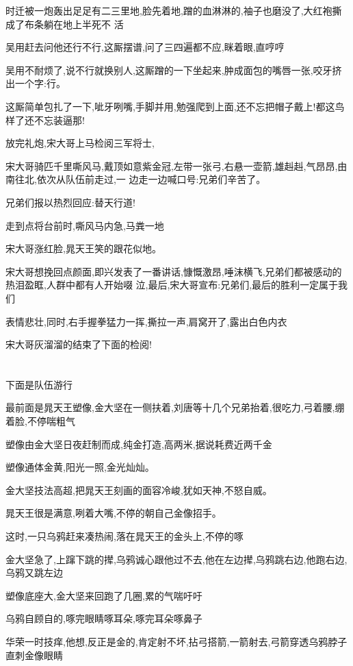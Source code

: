﻿\documentclass[12pt]{article}
\begin{document}
时迁被一炮轰出足足有二三里地,脸先着地,蹭的血淋淋的,袖子也磨没了,大红袍撕成了布条\dldots 躺在地上半死不
活\dldots

吴用赶去问他还行不行,这厮摆谱,问了三四遍都不应,眯着眼,直哼哼\dldots

吴用不耐烦了,说不行就换别人,这厮蹭的一下坐起来,肿成面包的嘴唇一张,咬牙挤出一个字:行。

这厮简单包扎了一下,呲牙咧嘴,手脚并用,勉强爬到上面,还不忘把帽子戴上!都这鸟样了还不忘装逼那!

放完礼炮,宋大哥上马检阅三军将士,

宋大哥骑匹千里嘶风马,戴顶如意紫金冠,左带一张弓,右悬一壶箭,雄赳赳,气昂昂,由南往北,依次从队伍前走过,一
边走一边喊口号:兄弟们辛苦了。

兄弟们报以热烈回应:替天行道!

走到点将台前时,嘶风马内急,马粪一地

宋大哥涨红脸,晁天王笑的跟花似地。

宋大哥想挽回点颜面,即兴发表了一番讲话,慷慨激昂,唾沫横飞,兄弟们都被感动的热泪盈眶,人群中都有人开始啜
泣,最后,宋大哥宣布:兄弟们,最后的胜利一定属于我们

表情悲壮,同时,右手握拳猛力一挥,撕拉一声,肩窝开了,露出白色内衣\dldots

宋大哥灰溜溜的结束了下面的检阅!
\section{}

下面是队伍游行

最前面是晁天王塑像,金大坚在一侧扶着,刘唐等十几个兄弟抬着,很吃力,弓着腰,绷着脸,不停喘粗气

塑像由金大坚日夜赶制而成,纯金打造,高两米,据说耗费近两千金

塑像通体金黄,阳光一照,金光灿灿。

金大坚技法高超,把晁天王刻画的面容冷峻,犹如天神,不怒自威。

晁天王很是满意,咧着大嘴,不停的朝自己金像招手。

这时,一只乌鸦赶来凑热闹,落在晁天王的金头上,不停的啄

金大坚急了,上蹿下跳的撵,乌鸦诚心跟他过不去,他在左边撵,乌鸦跳右边,他跑右边,乌鸦又跳左边

塑像底座大,金大坚来回跑了几圈,累的气喘吁吁

乌鸦自顾自的,啄完眼睛啄耳朵,啄完耳朵啄鼻子\dldots

华荣一时技痒,他想,反正是金的,肯定射不坏,拈弓搭箭,一箭射去,弓箭穿透乌鸦脖子直刺金像眼睛
\end{document}
